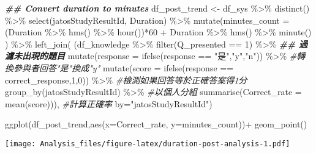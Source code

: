 \documentclass[
]{article}
\newenvironment{Shaded}{\begin{snugshade}}{\end{snugshade}}
\newcommand{\AttributeTok}[1]{\textcolor[rgb]{0.77,0.63,0.00}{#1}}
\newcommand{\CommentTok}[1]{\textcolor[rgb]{0.56,0.35,0.01}{\textit{#1}}}
\newcommand{\DecValTok}[1]{\textcolor[rgb]{0.00,0.00,0.81}{#1}}
\newcommand{\DocumentationTok}[1]{\textcolor[rgb]{0.56,0.35,0.01}{\textbf{\textit{#1}}}}
\newcommand{\FunctionTok}[1]{\textcolor[rgb]{0.00,0.00,0.00}{#1}}
\newcommand{\NormalTok}[1]{#1}
\newcommand{\OtherTok}[1]{\textcolor[rgb]{0.56,0.35,0.01}{#1}}
\newcommand{\SpecialCharTok}[1]{\textcolor[rgb]{0.00,0.00,0.00}{#1}}
\newcommand{\StringTok}[1]{\textcolor[rgb]{0.31,0.60,0.02}{#1}}
\begin{document}
\begin{Shaded}
\begin{Highlighting}[]
\DocumentationTok{\#\# Convert duration to minutes}
\NormalTok{df\_post\_trend }\OtherTok{\textless{}{-}}\NormalTok{ df\_sys }\SpecialCharTok{\%\textgreater{}\%} \FunctionTok{distinct}\NormalTok{() }\SpecialCharTok{\%\textgreater{}\%}
  \FunctionTok{select}\NormalTok{(jatosStudyResultId, Duration) }\SpecialCharTok{\%\textgreater{}\%}
  \FunctionTok{mutate}\NormalTok{(}\AttributeTok{minutes\_count =} 
\NormalTok{                    (Duration }\SpecialCharTok{\%\textgreater{}\%} \FunctionTok{hms}\NormalTok{() }\SpecialCharTok{\%\textgreater{}\%} \FunctionTok{hour}\NormalTok{())}\SpecialCharTok{*}\DecValTok{60} \SpecialCharTok{+}
\NormalTok{                    Duration }\SpecialCharTok{\%\textgreater{}\%} \FunctionTok{hms}\NormalTok{() }\SpecialCharTok{\%\textgreater{}\%} \FunctionTok{minute}\NormalTok{() ) }\SpecialCharTok{\%\textgreater{}\%}
  \FunctionTok{left\_join}\NormalTok{( (df\_knowledge }\SpecialCharTok{\%\textgreater{}\%} 
  \FunctionTok{filter}\NormalTok{(Q\_presented }\SpecialCharTok{==} \DecValTok{1}\NormalTok{) }\SpecialCharTok{\%\textgreater{}\%}   \DocumentationTok{\#\# 過濾未出現的題目}
  \FunctionTok{mutate}\NormalTok{(}\AttributeTok{response =} \FunctionTok{ifelse}\NormalTok{(response }\SpecialCharTok{==} \StringTok{"是"}\NormalTok{,}\StringTok{"y"}\NormalTok{,}\StringTok{"n"}\NormalTok{)) }\SpecialCharTok{\%\textgreater{}\%}       \CommentTok{\#轉換參與者回答"是"換成"y"}
  \FunctionTok{mutate}\NormalTok{(}\AttributeTok{score =} \FunctionTok{ifelse}\NormalTok{(response }\SpecialCharTok{==}\NormalTok{ correct\_response,}\DecValTok{1}\NormalTok{,}\DecValTok{0}\NormalTok{)) }\SpecialCharTok{\%\textgreater{}\%}  \CommentTok{\#檢測如果回答等於正確答案得1分}
  \FunctionTok{group\_by}\NormalTok{(jatosStudyResultId) }\SpecialCharTok{\%\textgreater{}\%}                               \CommentTok{\#以個人分組}
  \FunctionTok{summarise}\NormalTok{(}\AttributeTok{Correct\_rate =} \FunctionTok{mean}\NormalTok{(score))),    }\CommentTok{\#計算正確率}
\AttributeTok{by=}\StringTok{"jatosStudyResultId"}\NormalTok{)}

\FunctionTok{ggplot}\NormalTok{(df\_post\_trend,}\FunctionTok{aes}\NormalTok{(}\AttributeTok{x=}\NormalTok{Correct\_rate, }\AttributeTok{y=}\NormalTok{minutes\_count))}\SpecialCharTok{+}
   \FunctionTok{geom\_point}\NormalTok{()}
\end{Highlighting}
\end{Shaded}

\texttt{[image: Analysis\_files/figure-latex/duration-post-analysis-1.pdf]}
\end{document}
